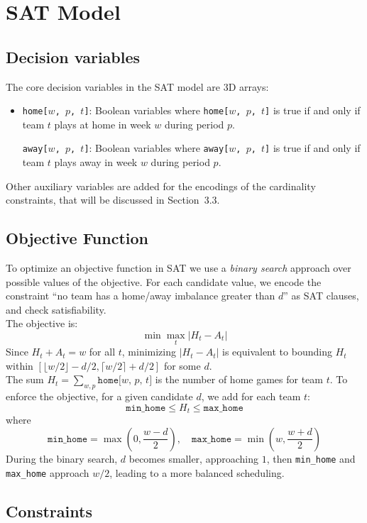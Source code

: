 \documentclass[11pt]{article}
\begin{document}
\section{SAT Model}

\subsection{Decision variables}
The core decision variables in the SAT model are 3D arrays: 
\begin{itemize}
    \item \texttt{home[$w$, $p$, $t$]}: Boolean variables where \texttt{home[$w$, $p$, $t$]} is true if and only if team $t$ plays at home in week $w$ during period $p$.

\texttt{away[$w$, $p$, $t$]}: Boolean variables where \texttt{away[$w$, $p$, $t$]} is true if and only if team $t$ plays away in week $w$ during period $p$.
\end{itemize}
Other auxiliary variables are added for the encodings of the cardinality constraints, that will be discussed in Section~3.3.

\subsection{Objective Function}

To optimize an objective function in SAT we use a \emph{binary search} approach over possible values of the objective. For each candidate value, we encode the constraint ``no team has a home/away imbalance greater than $d$'' as SAT clauses, and check satisfiability.
\\The objective is:
\[
\min \max_{t} |H_t - A_t|
\]
Since $H_t + A_t = w$ for all $t$, minimizing $|H_t - A_t|$ is equivalent to bounding $H_t$ within $[\lfloor w/2 \rfloor - d/2, \lceil w/2 \rceil + d/2]$ for some $d$.
\\
The sum $H_t = \sum_{w,p} \texttt{home[$w$, $p$, $t$]}$ is the number of home games for team $t$.
To enforce the objective, for a given candidate $d$, we add for each team $t$:
\[
\texttt{min\_home} \leq H_t \leq \texttt{max\_home}
\]
where
\[
\texttt{min\_home} = \max\left(0, \frac{w - d}{2}\right), \quad
\texttt{max\_home} = \min\left(w, \frac{w + d}{2}\right)
\]
During the binary search, $d$ becomes smaller, approaching $1$, then \texttt{min\_home} and \texttt{max\_home} approach $w/2$, leading to a more balanced scheduling.

\subsection{Constraints}
\end{document}
